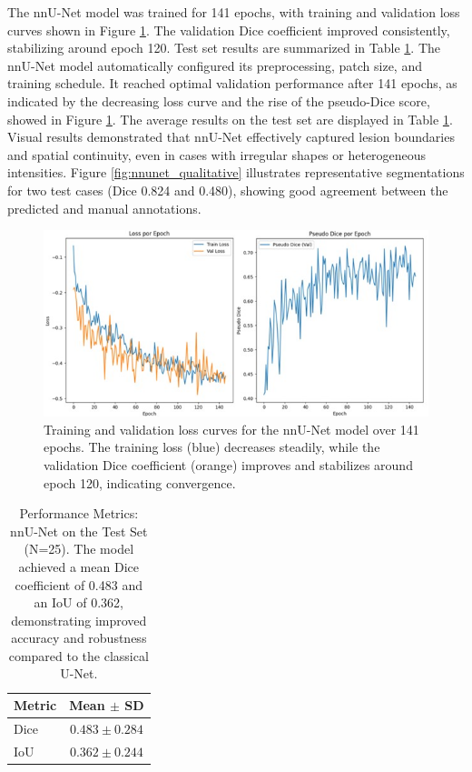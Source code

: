\documentclass[12pt]{article}
\begin{document}
The nnU-Net model was trained for 141 epochs, with training and validation loss curves shown in Figure \ref{fig:nnu-net_loss_curve}. The validation Dice coefficient improved consistently, stabilizing around epoch 120. Test set results are summarized in Table \ref{tab:nnunet_metrics}.
%
The nnU-Net model automatically configured its preprocessing, patch size, and training schedule. It reached optimal validation performance after 141 epochs, as indicated by the decreasing loss curve and the rise of the pseudo-Dice score, showed in Figure \ref{fig:nnu-net_loss_curve}. The average results on the test set are displayed in Table \ref{tab:nnunet_metrics}.
%
Visual results demonstrated that nnU-Net effectively captured lesion boundaries and spatial continuity, even in cases with irregular shapes or heterogeneous intensities. Figure \ref{fig:nnunet_qualitative} illustrates representative segmentations for two test cases (Dice 0.824 and 0.480), showing good agreement between the predicted and manual annotations.

\begin{figure}[tp]
    \centering
    \includegraphics[width=\textwidth]{figures/Figure 3.jpg}
    \caption{Training and validation loss curves for the nnU-Net model over 141 epochs. The training loss (blue) decreases steadily, while the validation Dice coefficient (orange) improves and stabilizes around epoch 120, indicating convergence.}\label{fig:nnu-net_loss_curve}
\end{figure}

\begin{table}[tp]
  \centering
    \begin{tabular}{lc}
      \toprule
        Metric & Mean $\pm$ SD \\
      \midrule
        Dice & $0.483 \pm 0.284$ \\
        IoU & $0.362 \pm 0.244$ \\
      \bottomrule
    \end{tabular}
  \caption{Performance Metrics: nnU-Net on the Test Set (N=25). The model achieved a mean Dice coefficient of 0.483 and an IoU of 0.362, demonstrating improved accuracy and robustness compared to the classical U-Net.}\label{tab:nnunet_metrics}
\end{table}
\end{document}
